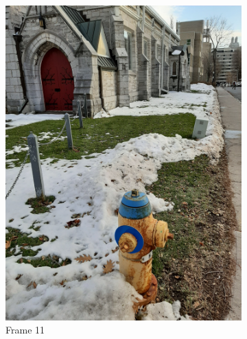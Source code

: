 \documentclass[conference]{IEEEtran}
\begin{document}
\begin{figure}[!h]
\begin{subfigure}[b]{0.2\linewidth}
    \includegraphics[width=\linewidth, angle = -90]{images/frame11.jpg}
    \caption{Frame 11}
  \end{subfigure}
  \begin{subfigure}[b]{0.2\linewidth}

\end{subfigure}
\end{figure}
\end{document}
